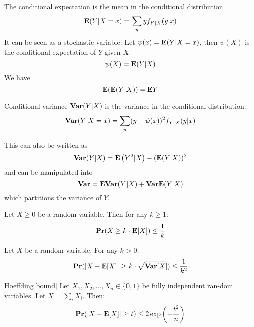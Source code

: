 \documentclass[11pt]{article}
\begin{document}
\begin{definition}
The conditional expectation is the mean in the conditional distribution
\begin{equation}
\mathbf{E}(Y | X=x)=\sum_{y} y f_{Y | X}(y | x)
\end{equation}
It can be seen as a stochastic variable: Let $\psi(x)=\mathbf{E}(Y | X=x)$,
then $\psi(X)$ is the conditional expectation of $Y$ given $X$
\begin{equation}
\psi(X)=\mathbf{E}(Y | X)
\end{equation}
We have
\begin{equation}
\mathbf{E}(\mathbf{E}(Y | X))=\mathbf{E} Y
\end{equation}
\end{definition}

\begin{definition}
Conditional variance $\mathbf{Var}(Y|X)$ is the variance in the conditional distribution.
\begin{equation}
\mathbf{Var}(Y | X=x)=\sum_{y}(y-\psi(x))^{2} f_{Y | X}(y | x)
\end{equation}

This can also be written as
$$
\mathbf{Var}(Y | X)=\mathbf{E}\left(Y^{2} | X\right)-(\mathbf{E}(Y | X))^{2}
$$
and can be manipulated into
$$
\mathbf{Var}=\mathbf{E} \mathbf{Var}(Y | X)+\mathbf{Var} \mathbf{E}(Y | X)
$$
which partitions the variance of $Y$.
\end{definition}

\begin{theorem}
Let $X \geq 0$ be a random variable. Then for any $k \geq 1:$
\begin{equation}
\mathbf{Pr}(X \geq k \cdot \mathbf{E}[X]) \leq \frac{1}{k}
\end{equation}
\end{theorem}
\begin{theorem}
Let $X$ be a random variable. For any $k>0$:
\begin{equation}
\mathbf{Pr}(|X-\mathbf{E}[X]| \geq k \cdot \sqrt{\mathbf{Var}[X]}) \leq \frac{1}{k^{2}}
\end{equation}
\end{theorem}
\begin{theorem}[]Hoeffding bound]
Let $X_{1}, X_{2}, \ldots, X_{n} \in\{0,1\}$ be fully independent ran-dom variables. Let $X=\sum_{i} X_{i} .$ Then:
\begin{equation}
    \mathbf{Pr}(|X-\mathbf{E}[X]| \geq t) \leq 2 \exp \left(-\frac{t^{2}}{n}\right)
\end{equation}
\end{theorem}
\end{document}
